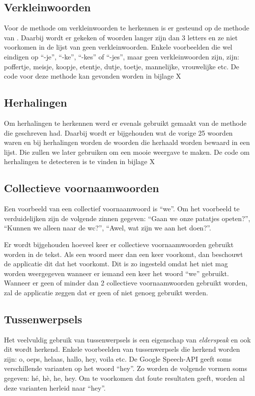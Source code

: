 \subsection{Verkleinwoorden}
Voor de methode om verkleinwoorden te herkennen is er gesteund op de methode van \textcite{Standaert2021}. Daarbij wordt er gekeken of woorden langer zijn dan 3 letters en ze niet voorkomen in de lijst van geen verkleinwoorden. Enkele voorbeelden die wel eindigen op ``-je'', ``-ke'', ``-kes'' of ``-jes'', maar geen verkleinwoorden zijn, zijn: poffertje, meisje, koopje, etentje, dutje, toetje, mannelijke, vrouwelijke etc. De code voor deze methode kan gevonden worden in bijlage X
\subsection{Herhalingen}
Om herhalingen te herkennen werd er evenals gebruikt gemaakt van de methode die \textcite{Standaert2021} geschreven had. Daarbij wordt er bijgehouden wat de vorige 25 woorden waren en bij herhalingen worden de woorden die herhaald worden bewaard in een lijst. Die zullen we later gebruiken om een mooie weergave te maken.
De code om herhalingen te detecteren is te vinden in bijlage X

\subsection{Collectieve voornaamwoorden}
Een voorbeeld van een collectief voornaamwoord is ``we''. Om het voorbeeld te verduidelijken zijn de volgende zinnen gegeven: ``Gaan we onze patatjes opeten?'', ``Kunnen we alleen naar de wc?'', ``Awel, wat zijn we aan het doen?''.

Er wordt bijgehouden hoeveel keer er collectieve voornaamwoorden gebruikt worden in de tekst. Als een woord meer dan een keer voorkomt, dan beschouwt de applicatie dit dat het voorkomt. Dit is zo ingesteld omdat het niet mag worden weergegeven wanneer er iemand een keer het woord ``we'' gebruikt.
Wanneer er geen of minder dan 2 collectieve voornaamwoorden gebruikt worden, zal de applicatie zeggen dat er geen of niet genoeg gebruikt werden.

\subsection{Tussenwerpsels}
Het veelvuldig gebruik van tussenwerpsels is een eigenschap van \textit{elderspeak} en ook dit wordt herkend. Enkele voorbeelden van tussenwerpsels die herkend worden zijn: o, oeps, helaas, hallo, hey, voila etc. De Google Speech-API geeft soms verschillende varianten op het woord ``hey''. Zo worden de volgende vormen soms gegeven: hé, hè, he, hey. Om te voorkomen dat foute resultaten geeft, worden al deze varianten herleid naar ``hey''.

